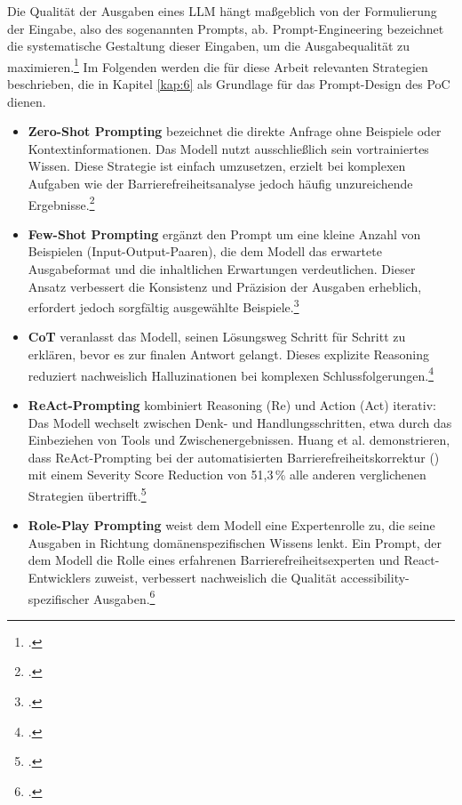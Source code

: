 Die Qualität der Ausgaben eines \ac{LLM} hängt maßgeblich von der Formulierung der Eingabe, also des sogenannten Prompts, ab. Prompt-Engineering bezeichnet die systematische Gestaltung dieser Eingaben, um die Ausgabequalität zu maximieren.\footcite[Vgl.][S. 4]{schulhoff2024promptreport} Im Folgenden werden die für diese Arbeit relevanten Strategien beschrieben, die in Kapitel \ref{kap:6} als Grundlage für das Prompt-Design des \ac{PoC} dienen.

\begin{itemize}
    \item \textbf{Zero-Shot Prompting} bezeichnet die direkte Anfrage ohne Beispiele oder Kontextinformationen. Das Modell nutzt ausschließlich sein vortrainiertes Wissen. Diese Strategie ist einfach umzusetzen, erzielt bei komplexen Aufgaben wie der Barrierefreiheitsanalyse jedoch häufig unzureichende Ergebnisse.\footcites[Vgl.][S. 4]{brown2020gpt3fewshot}[][]{njifenjou_role-play_2024}
    \item \textbf{Few-Shot Prompting} ergänzt den Prompt um eine kleine Anzahl von Beispielen (Input-Output-Paaren), die dem Modell das erwartete Ausgabeformat und die inhaltlichen Erwartungen verdeutlichen. Dieser Ansatz verbessert die Konsistenz und Präzision der Ausgaben erheblich, erfordert jedoch sorgfältig ausgewählte Beispiele.\footcite[Vgl.][S. 5]{brown2020gpt3fewshot}
    \item \textbf{\ac{CoT}} veranlasst das Modell, seinen Lösungsweg Schritt für Schritt zu erklären, bevor es zur finalen Antwort gelangt. Dieses explizite Reasoning reduziert nachweislich Halluzinationen bei komplexen Schlussfolgerungen.\footcites[Vgl.][S. 2]{wei2022chainofthought}[][]{fathallah_accessguru_2025}
    \item \textbf{ReAct-Prompting} kombiniert Reasoning (Re) und Action (Act) iterativ: Das Modell wechselt zwischen Denk- und Handlungsschritten, etwa durch das Einbeziehen von Tools und Zwischenergebnissen. Huang et al. demonstrieren, dass ReAct-Prompting bei der automatisierten Barrierefreiheitskorrektur () mit einem Severity Score Reduction von 51{,}3\,\% alle anderen verglichenen Strategien übertrifft.\footcites[Vgl.][S. 5]{huang_access_2024}[][S. 1]{yao2022react}
    \item \textbf{Role-Play Prompting} weist dem Modell eine Expertenrolle zu, die seine Ausgaben in Richtung domänenspezifischen Wissens lenkt. Ein Prompt, der dem Modell die Rolle eines \glqq erfahrenen Barrierefreiheitsexperten und React-Entwicklers\grqq{} zuweist, verbessert nachweislich die Qualität accessibility-spezifischer Ausgaben.\footcites[Vgl.][]{fathallah_accessguru_2025}[][]{njifenjou_role-play_2024}[][S. 6, 12]{schulhoff2024promptreport}

\end{itemize}
